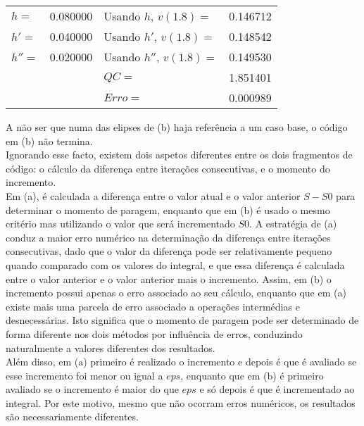 {\begin{center}
\begin{tabular}{l | c || l | c}
	$h  =$ & 0.080000 & Usando $h  $, $v(1.8)=$ & 0.146712 \\
	$h' =$ & 0.040000 & Usando $h' $, $v(1.8)=$ & 0.148542 \\
	$h''=$ & 0.020000 & Usando $h''$, $v(1.8)=$ & 0.149530 \\
           &          & $QC=$                   & 1.851401 \\
           &          & $Erro=$                 & 0.000989
\end{tabular} \end{center}
A não ser que numa das elipses de (b) haja referência a um caso base, o código em (b) não termina.\\
Ignorando esse facto, existem dois aspetos diferentes entre os dois fragmentos de código: o cálculo da diferença entre iterações consecutivas, e o momento do incremento.\\
Em (a), é calculada a diferença entre o valor atual e o valor anterior $S-S0$ para determinar o momento de paragem, enquanto que em (b) é usado o mesmo critério mas utilizando o valor que será incrementado $S0$. A estratégia de (a) conduz a maior erro numérico na determinação da diferença entre iterações consecutivas, dado que o valor da diferença pode ser relativamente pequeno quando comparado com os valores do integral, e que essa diferença é calculada entre o valor anterior e o valor anterior mais o incremento. Assim, em (b) o incremento possui apenas o erro associado ao seu cálculo, enquanto que em (a) existe mais uma parcela de erro associado a operações intermédias e desnecessárias. Isto significa que o momento de paragem pode ser determinado de forma diferente nos dois métodos por influência de erros, conduzindo naturalmente a valores diferentes dos resultados.\\
Além disso, em (a) primeiro é realizado o incremento e depois é que é avaliado se esse incremento foi menor ou igual a $eps$, enquanto que em (b) é primeiro avaliado se o incremento é maior do que $eps$ e só depois é que é incrementado ao integral. Por este motivo, mesmo que não ocorram erros numéricos, os resultados são necessariamente diferentes.
}